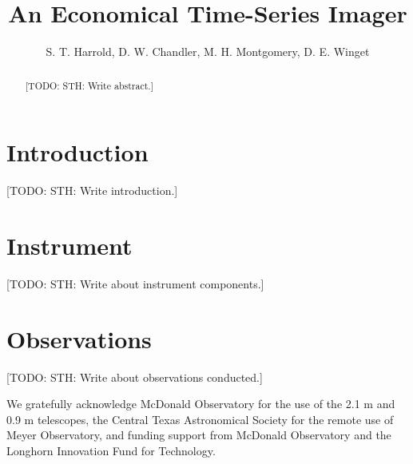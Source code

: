 \documentclass[preprint2]{aastex}
\begin{document}
\title{An Economical Time-Series Imager}

\author{
    S. T. Harrold,
    D. W. Chandler,
    M. H. Montgomery,
    D. E. Winget}


\begin{abstract}
[TODO: STH: Write abstract.]
\end{abstract}



\section{Introduction}

[TODO: STH: Write introduction.]

\section{Instrument}


[TODO: STH: Write about instrument components.]

\section{Observations}

[TODO: STH: Write about observations conducted.]

\acknowledgments


\acknowledgments

We gratefully acknowledge McDonald Observatory for the use of the 2.1 m and 0.9 m telescopes, the Central Texas Astronomical Society for the remote use of Meyer Observatory, and funding support from McDonald Observatory and the Longhorn Innovation Fund for Technology.
\end{document}
